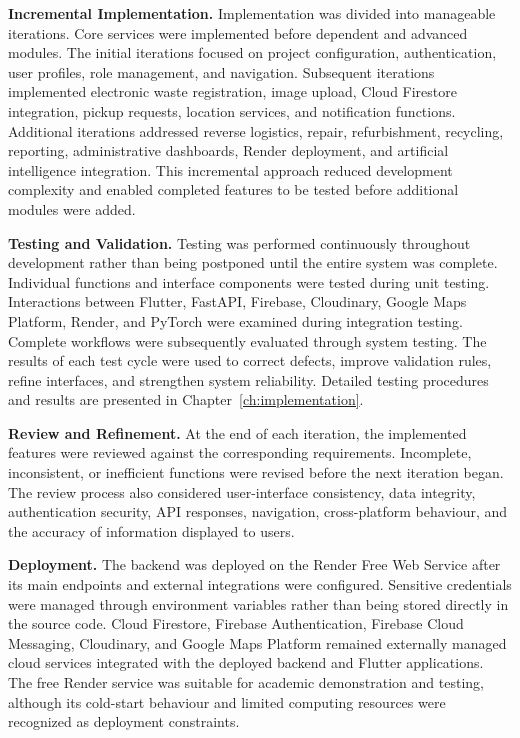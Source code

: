 \textbf{Incremental Implementation.} Implementation was divided into
manageable iterations. Core services were implemented before dependent and
advanced modules. The initial iterations focused on project configuration,
authentication, user profiles, role management, and navigation. Subsequent
iterations implemented electronic waste registration, image upload, Cloud
Firestore integration, pickup requests, location services, and notification
functions. Additional iterations addressed reverse logistics, repair, refurbishment,
recycling, reporting, administrative dashboards, Render deployment, and
artificial intelligence integration. This incremental approach reduced development
complexity and enabled completed features to be tested before additional
modules were added.

\textbf{Testing and Validation.} Testing was performed continuously throughout
development rather than being postponed until the entire system was complete.
Individual functions and interface components were tested during unit testing.
Interactions between Flutter, FastAPI, Firebase, Cloudinary, Google Maps
Platform, Render, and PyTorch were examined during integration testing. Complete workflows were
subsequently evaluated through system testing. The results of each test cycle were
used to correct defects, improve validation rules, refine interfaces, and strengthen
system reliability. Detailed testing procedures and results are presented in
Chapter~\ref{ch:implementation}.

\textbf{Review and Refinement.} At the end of each iteration, the implemented
features were reviewed against the corresponding requirements. Incomplete,
inconsistent, or inefficient functions were revised before the next iteration began.
The review process also considered user-interface consistency, data integrity,
authentication security, API responses, navigation, cross-platform behaviour, and
the accuracy of information displayed to users.

\textbf{Deployment.} The backend was deployed on the Render Free Web Service
after its main endpoints and external integrations were configured. Sensitive
credentials were managed through environment variables rather than being
stored directly in the source code. Cloud Firestore, Firebase Authentication,
Firebase Cloud Messaging, Cloudinary, and Google Maps Platform remained
externally managed cloud services integrated with the deployed backend and
Flutter applications. The
free Render service was suitable for academic demonstration and testing, although
its cold-start behaviour and limited computing resources were recognized as
deployment constraints.

